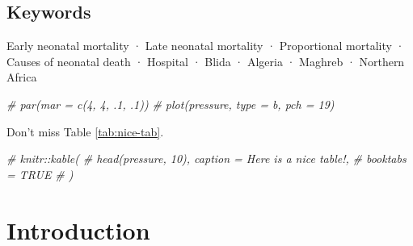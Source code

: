 \documentclass[
]{book}
\newenvironment{Shaded}{\begin{snugshade}}{\end{snugshade}}
\newcommand{\CommentTok}[1]{\textcolor[rgb]{0.56,0.35,0.01}{\textit{#1}}}
\begin{document}
\hypertarget{keywords}{%
\section{Keywords}\label{keywords}}

Early neonatal mortality · Late neonatal mortality · Proportional mortality ·
Causes of neonatal death · Hospital · Blida · Algeria · Maghreb · Northern
Africa

\begin{Shaded}
\begin{Highlighting}[]
\CommentTok{\# par(mar = c(4, 4, .1, .1))}
\CommentTok{\# plot(pressure, type = \textquotesingle{}b\textquotesingle{}, pch = 19)}
\end{Highlighting}
\end{Shaded}

Don't miss Table \ref{tab:nice-tab}.

\begin{Shaded}
\begin{Highlighting}[]
\CommentTok{\# knitr::kable(}
\CommentTok{\#   head(pressure, 10), caption = \textquotesingle{}Here is a nice table!\textquotesingle{},}
\CommentTok{\#   booktabs = TRUE}
\CommentTok{\# )}
\end{Highlighting}
\end{Shaded}

\hypertarget{introduction-1}{%
\chapter{Introduction}\label{introduction-1}}
\end{document}
